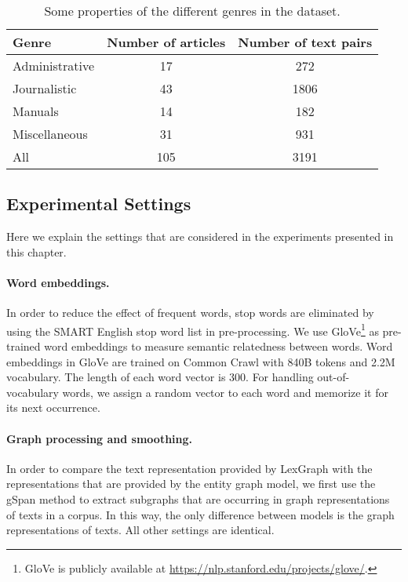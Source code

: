 \begin{table}[!ht]
  \begin{center}
    \begin{tabular}{lcc}
      \toprule
      \textbf{Genre} & \textbf{Number of articles} & \textbf{Number of text pairs} \\
      \midrule
      Administrative  & 17                 & 272                  \\
      Journalistic    & 43                 & 1806                 \\
      Manuals         & 14                 & 182                  \\
      Miscellaneous   & 31                 & 931                  \\
      All             & 105                & 3191                 \\
      \bottomrule
    \end{tabular}
  \end{center}
  \caption{Some properties of the different genres in the \declercqds dataset.}
  \label{tab:genre-prop}
\end{table}

\subsection{Experimental Settings}
Here we explain the settings that are considered in the experiments presented in this chapter. 

\paragraph{Word embeddings.}
In order to reduce the effect of frequent words, stop words are eliminated by using the SMART English stop word list \cite{salton71} in pre-processing.  
We use GloVe\footnote{GloVe is publicly available at \url{https://nlp.stanford.edu/projects/glove/}.} \cite{pennington14} as \mbox{pre-trained} word embeddings to measure semantic relatedness between words. 
Word embeddings in GloVe are trained on Common Crawl with 840B tokens and 2.2M vocabulary. 
The length of each word vector is 300. 
For handling \mbox{out-of-vocabulary} words, we assign a random vector to each word and memorize it for its next occurrence.  

\paragraph{Graph processing and smoothing.} 
In order to compare the text representation provided by LexGraph with the representations that are provided by the entity graph model, we first use the gSpan method \cite{yanxifeng02} to extract subgraphs that are occurring in graph representations of texts in a corpus. 
In this way, the only difference between models is the graph representations of texts. 
All other settings are identical. 

